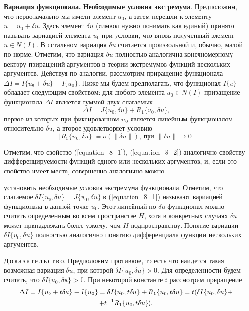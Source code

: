 	{\bf Вариация функционала. Необходимые условия экстремума}.
	Предположим, что первоначально мы имели элемент $u_0$, а затем перешли к элементу $u=u_0+\delta u$. Здесь элемент $\delta u$ (символ нужно понимать как единый) принято называть вариацией элемента $u_0$ при условии, что вновь полученный элемент $u\in N(I)$. В остальном вариация $\delta u$ считается произвольной и, обычно, малой по норме.
	Отметим, что вариация $\delta u$ полностью аналогична конечномерному вектору приращений аргументов в теории экстремумов функций нескольких аргументов. Действуя по аналогии, рассмотрим приращение функционала $\Delta I=I\{u_0+\delta u\}-I\{u_0\}$. Ниже мы будем предполагать, что функционал $I\{u\}$ обладает следующим свойством: для любого элемента $u_0\in N(I)$ приращение функционала $\Delta I$ является суммой двух слагаемых
	\begin{equation}
	\label{equation_8_1}
         \Delta I=J\{u_0, \delta u\}+R_1\{u_0, \delta u\}\text{,}
    	\end{equation}
    первое из которых при фиксированном $u_0$ является линейным функционалом относительно $\delta u$, а второе удовлетворяет условию
   \begin{equation}
	\label{equation_8_2}
    	|R_1\{u_0, \delta u\}|=o(\|\delta u\|)\text{, при }\|\delta u\|\to 0.
   \end{equation}

	Отметим, что свойство (\ref{equation_8_1}), (\ref{equation_8_2}) аналогично свойству дифференцируемости функций одного или нескольких аргументов, и, если это свойство имеет место, совершенно аналогично можно

	\newpage
	\noindent
	установить необходимые условия экстремума функционала. Отметим, что слагаемое $\delta I\{u_0, \delta u\}=J\{u_0, \delta u\}$ в (\ref{equation_8_1}) называют вариацией функционала в данной точке $u_0$. Этот линейный по $\delta u$ функционал можно считать определенным во всем пространстве $H$, хотя в конкретных случаях $\delta u$ может принадлежать более узкому, чем $H$ подпространству. Понятие вариации $\delta I\{u_0, \delta u\}$ полностью аналогично понятию дифференциала функции нескольких аргументов.


	\vspace*{-\baselineskip}
	Д\,о\,к\,а\,з\,а\,т\,е\,л\,ь\,с\,т\,в\,о. Предположим противное, то есть что найдется такая возможная вариация $\delta u$, при которой $\delta I\{u_0, \delta u\}>0$. Для определенности будем считать, что $\delta I\{u_0, \delta u\}>0$. При некоторой константе $t$ рассмотрим приращение
	\begin{gather}
	\Delta I=I\{u_0+t\delta u\}-I\{u_0\}=\delta I\{u_0, t\delta u\}+R_1\{u_0, t\delta u\}=t(\delta I\{u_0, \delta u\}+\notag\\
	+t^{-1}R_1\{u_0,t\delta u\})\text{.}\notag
	\end{gather}

